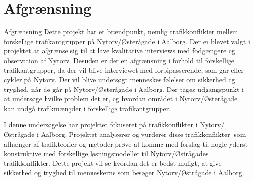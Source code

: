 \chapter{Afgrænsning}
\label{chap:Afgrænsning}

Afgrænsning
Dette projekt har et brændpunkt, nemlig trafikkonflikter mellem forskellige trafikantgrupper på Nytorv/Østerågade i Aalborg. Der er blevet valgt i projektet at afgrænse sig til at lave kvalitative interviews med fodgængere og observation af Nytorv. Desuden er der en afgrænsning i forhold til forskellige trafikantgrupper, da der vil blive interviewet med forbipasserende, som går eller cykler på Nytorv. Der vil blive undersøgt menneskes følelser om sikkerhed og tryghed, når de går på Nytorv/Østerågade i Aalborg. Der tages udgangspunkt i at undersøge hvilke problem det er, og hvordan området i Nytorv/Østerågade kan undgå trafikmængder i forskellige trafikantgrupper.

I denne undersøgelse har projektet fokuseret på trafikkonflikter i Nytorv/Østrågade i Aalborg. Projektet analyserer og vurderer disse trafikkonflikter, som afhænger af trafikteorier og metoder prøve at komme med forslag til nogle yderst konstruktive med forskellige løsningsmodeller til Nytorv/Østrågades trafikkonflikter.  Dette projekt vil se hvordan det er bedst muligt, at give sikkerhed og tryghed til menneskerne som besøger Nytorv/Østrågade i Aalborg.
